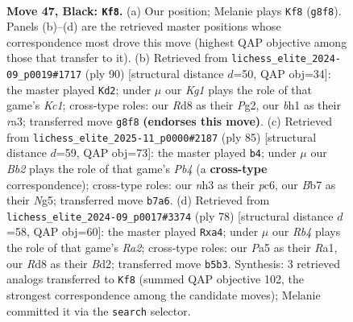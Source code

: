\documentclass[11pt]{article}
\begin{document}
\clearpage

\begin{figure}[p]\centering
\begin{subfigure}{0.46\textwidth}\centering
\resizebox{\linewidth}{!}{%
\newchessgame
\chessboard[
  setfen={3r2k1/1b3p1p/8/pr6/3p2P1/1P5N/1R1K3P/2R4B b - - 9 47},
  showmover=false,
  pgfstyle=straightmove, color=movearrow, markmove={g8-f8}
]}
\caption{}
\end{subfigure}\hfill
\begin{subfigure}{0.46\textwidth}\centering
\resizebox{\linewidth}{!}{%
\newchessgame
\chessboard[
  setfen={r7/6p1/7p/8/2p1k3/r1P4P/p1R2PP1/R1K5 w - - 14 46},
  showmover=false,
  pgfstyle=straightmove, color=movearrow, markmove={c1-d2}
]}
\caption{}
\end{subfigure}
\\[4pt]
\begin{subfigure}{0.46\textwidth}\centering
\resizebox{\linewidth}{!}{%
\newchessgame
\chessboard[
  setfen={2k1r3/2p5/2Pp4/rp4n1/8/P1N2P2/3K4/R4R2 b - - 2 43},
  showmover=false,
  pgfstyle=straightmove, color=movearrow, markmove={b5-b4}
]}
\caption{}
\end{subfigure}\hfill
\begin{subfigure}{0.46\textwidth}\centering
\resizebox{\linewidth}{!}{%
\newchessgame
\chessboard[
  setfen={r1r5/4kp2/2P3p1/4p1P1/p1P5/5PK1/R2B4/R7 w - - 1 40},
  showmover=false,
  pgfstyle=straightmove, color=movearrow, markmove={a2-a4}
]}
\caption{}
\end{subfigure}
\caption{\textbf{Move 47, Black: \texttt{Kf8}.} (a) Our position; Melanie plays \texttt{Kf8} (\texttt{g8f8}). Panels (b)--(d) are the retrieved master positions whose correspondence most drove this move (highest QAP objective among those that transfer to it). (b) Retrieved from \texttt{lichess\_elite\_2024-09\_p0019\#1717} (ply 90) [structural distance $d$=50, QAP obj=34]: the master played \texttt{Kd2}; under $\mu$ our \emph{Kg1} plays the role of that game's \emph{Kc1}; cross-type roles: our \emph{R}d8 as their \emph{P}g2, our \emph{b}h1 as their \emph{r}a3; transferred move \texttt{g8f8} \textbf{(endorses this move)}. (c) Retrieved from \texttt{lichess\_elite\_2025-11\_p0000\#2187} (ply 85) [structural distance $d$=59, QAP obj=73]: the master played \texttt{b4}; under $\mu$ our \emph{Bb2} plays the role of that game's \emph{Pb4} (a \textbf{cross-type} correspondence); cross-type roles: our \emph{n}h3 as their \emph{p}c6, our \emph{B}b7 as their \emph{N}g5; transferred move \texttt{b7a6}. (d) Retrieved from \texttt{lichess\_elite\_2024-09\_p0017\#3374} (ply 78) [structural distance $d$=58, QAP obj=60]: the master played \texttt{Rxa4}; under $\mu$ our \emph{Rb4} plays the role of that game's \emph{Ra2}; cross-type roles: our \emph{P}a5 as their \emph{R}a1, our \emph{R}d8 as their \emph{B}d2; transferred move \texttt{b5b3}. Synthesis: 3 retrieved analogs transferred to \texttt{Kf8} (summed QAP objective 102, the strongest correspondence among the candidate moves); Melanie committed it via the \texttt{search} selector.}
\label{fig:thought-m93}
\end{figure}
\end{document}
